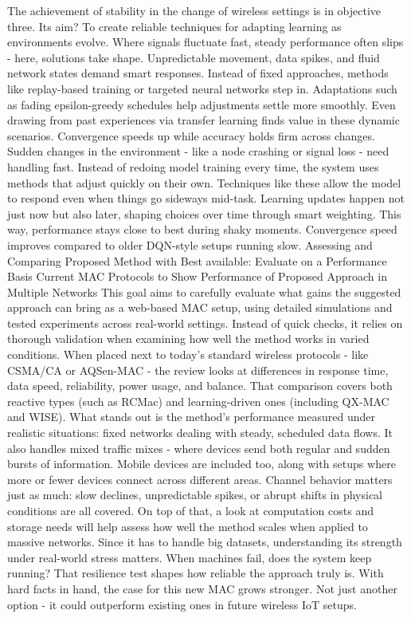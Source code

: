 \documentclass[a4paper,fleqn]{cas-dc}
\numberwithin{equation}{section}
\begin{document}
The achievement of stability in the change of wireless settings is in objective three. Its aim? To create reliable techniques for adapting learning as environments evolve. Where signals fluctuate fast, steady performance often slips - here, solutions take shape. Unpredictable movement, data spikes, and fluid network states demand smart responses. Instead of fixed approaches, methods like replay-based training or targeted neural networks step in. Adaptations such as fading epsilon-greedy schedules help adjustments settle more smoothly. Even drawing from past experiences via transfer learning finds value in these dynamic scenarios. Convergence speeds up while accuracy holds firm across changes. Sudden changes in the environment - like a node crashing or signal loss - need handling fast. Instead of redoing model training every time, the system uses methods that adjust quickly on their own. Techniques like these allow the model to respond even when things go sideways mid-task. Learning updates happen not just now but also later, shaping choices over time through smart weighting. This way, performance stays close to best during shaky moments. Convergence speed improves compared to older DQN-style setups running slow.\cite{Ni2024138519}\cite{Adamu2025457}
Assessing and Comparing Proposed Method with Best available: Evaluate on a Performance Basis Current MAC Protocols to Show Performance of Proposed Approach in Multiple Networks\cite{Kim202412918}
This goal aims to carefully evaluate what gains the suggested approach can bring as a web-based MAC setup, using detailed simulations and tested experiments across real-world settings. Instead of quick checks, it relies on thorough validation when examining how well the method works in varied conditions. When placed next to today's standard wireless protocols - like CSMA/CA or AQSen-MAC - the review looks at differences in response time, data speed, reliability, power usage, and balance. That comparison covers both reactive types (such as RCMac) and learning-driven ones (including QX-MAC and WISE). What stands out is the method’s performance measured under realistic situations: fixed networks dealing with steady, scheduled data flows. It also handles mixed traffic mixes - where devices send both regular and sudden bursts of information. Mobile devices are included too, along with setups where more or fewer devices connect across different areas. Channel behavior matters just as much: slow declines, unpredictable spikes, or abrupt shifts in physical conditions are all covered. On top of that, a look at computation costs and storage needs will help assess how well the method scales when applied to massive networks. Since it has to handle big datasets, understanding its strength under real-world stress matters. When machines fail, does the system keep running? That resilience test shapes how reliable the approach truly is. With hard facts in hand, the case for this new MAC grows stronger. Not just another option - it could outperform existing ones in future wireless IoT setups.\cite{Xin20251042}\cite{Ni2024138519}
\end{document}
